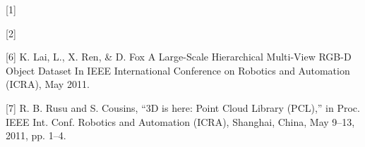 
[1] 

[2] 

[6] K. Lai, L., X. Ren, & D. Fox  A Large-Scale Hierarchical Multi-View RGB-D Object Dataset In IEEE International Conference on Robotics and Automation (ICRA), May 2011.

[7] R. B. Rusu and S. Cousins, “3D is here: Point Cloud Library (PCL),”
in Proc. IEEE Int. Conf. Robotics and Automation (ICRA), Shanghai,
China, May 9–13, 2011, pp. 1–4.
